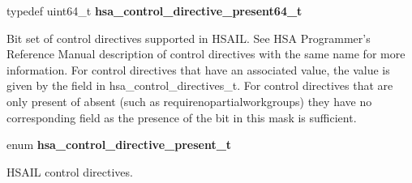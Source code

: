 \documentclass[final]{book}
\begin{document}
\begin{appendices}
\noindent\begin{tcolorbox}[nobeforeafter,arc=0mm,colframe=white,colback=lightgray,left=0mm]
typedef uint64_t  \hypertarget{group--FinalizerCoreApi-1gabcb5b180378955bdddf0d50976f1e384}{\textbf{hsa_control_directive_present64_t}}
\end{tcolorbox}
Bit set of control directives supported in HSAIL. See HSA Programmer's Reference Manual description of control directives with the same name for more information. For control directives that have an associated value, the value is given by the field in hsa_control_directives_t. For control directives that are only present of absent (such as requirenopartialworkgroups) they have no corresponding field as the presence of the bit in this mask is sufficient.
\\

\noindent\begin{tcolorbox}[nobeforeafter,arc=0mm,colframe=white,colback=lightgray,left=0mm]
enum \hypertarget{group--FinalizerCoreApi-1gac86e8f3e8ccba532765320c93b18ac95}{\textbf{hsa_control_directive_present_t}}
\end{tcolorbox}
HSAIL control directives.


\end{appendices}
\end{document}
